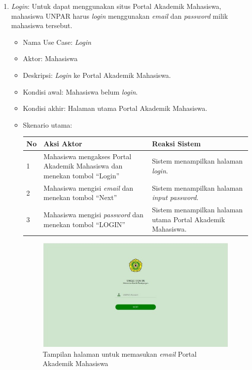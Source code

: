 \begin{enumerate}
	\item \textit{Login}: Untuk dapat menggunakan situs Portal Akademik Mahasiswa, mahasiswa UNPAR harus \textit{login} menggunakan \textit{email} dan \textit{password} milik mahasiswa tersebut.
	\begin{itemize}
		\item Nama Use Case: \textit{Login}
		\item Aktor: Mahasiswa
		\item Deskripsi: \textit{Login} ke Portal Akademik Mahasiswa.
		\item Kondisi awal: Mahasiswa belum \textit{login}.
		\item Kondisi akhir: Halaman utama Portal Akademik Mahasiswa.
		\item Skenario utama:
		\begin{table}[h!]
			\centering
			\label{}
			\begin{tabular}{ | m{0.5cm} | m{7cm}| m{6cm} | } 
				\hline
				No & Aksi Aktor & Reaksi Sistem \\ 
				\hline
				1 & Mahasiswa mengakses Portal Akademik Mahasiswa dan menekan tombol ``Login'' & Sistem menampilkan halaman \textit{login}.
				\\ 
				\hline
				2 & Mahasiswa mengisi \textit{email} dan menekan tombol ``Next'' & Sistem menampilkan halaman \textit{input password}.
				\\ 
				\hline
				3 & Mahasiswa mengisi \textit{password} dan menekan tombol ``LOGIN'' & Sistem menampilkan halaman utama Portal Akademik Mahasiswa.
				\\ 
				\hline
			\end{tabular}
		\end{table}
	
		\begin{figure}[H] 
			\centering
			\includegraphics[scale=0.6]{Gambar/sso2018.jpg}
			\caption{Tampilan halaman untuk memasukan \textit{email} Portal Akademik Mahasiswa} 
			\label{fig:sso_2018}
		\end{figure}
		

\end{itemize}
\end{enumerate}
